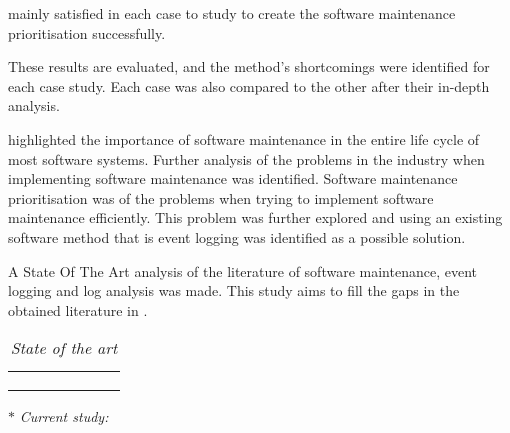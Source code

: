mainly satisfied in each case to study to create the software maintenance prioritisation successfully.\par These results are evaluated, and the method's shortcomings were identified for each case study. Each case was also compared to the other after their in-depth analysis.

\clearpage

 highlighted the importance of software maintenance in the entire life cycle of most software systems. Further analysis of the problems in the industry when implementing software maintenance was identified. Software maintenance prioritisation was of the problems when trying to implement software maintenance efficiently. This problem was further explored and using an existing software method that is event logging was identified as a possible solution.\par  A State Of The Art analysis of  the literature of software maintenance, event logging and log analysis was made. This study aims to fill the gaps in the obtained literature in .

\begin{table}[!htb]
	\centering
	\caption[State of the art]
	{\textit{State of the art}}
	\label{tbl:ch4_stateOfTheArt}
	\begin{threeparttable}
		\begin{tabularx}{\textwidth}{cYYYYYY}
			\toprule
			 &  &  &  \\ 
			 \cmidrule(lr){2-4} \cmidrule(lr){5-6} \cmidrule(lr){7-7}
			 & \RaggedRight {} & \RaggedRight {} & \RaggedRight {} &  &  & \RaggedRight {} \\ 		
			\midrule
				\sotaCore
				\tnote{$\ast$} & \cmark & \cmark & \cmark & \cmark & \cmark & \cmark \\
			\bottomrule
		\end{tabularx}
		\begin{tablenotes}\footnotesize
			\item[$\ast$] \textit{Current study:~\ThesisTitle}
		\end{tablenotes}
	\end{threeparttable}
\end{table}

